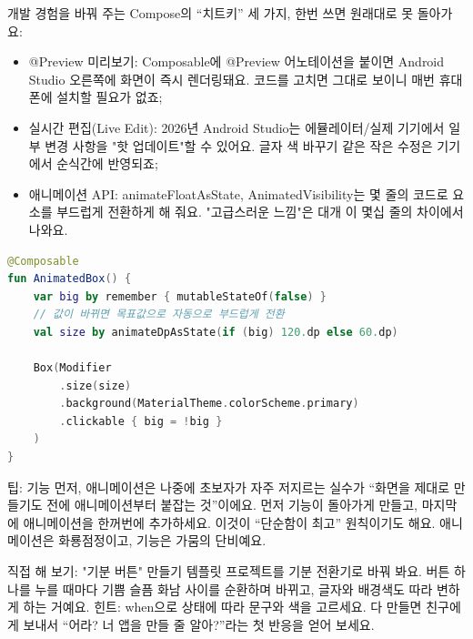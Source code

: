 
개발 경험을 바꿔 주는 Compose의 “치트키” 세 가지, 한번 쓰면 원래대로 못 돌아가요:

\begin{itemize}
  \item @Preview 미리보기: Composable에 @Preview 어노테이션을 붙이면 Android Studio 오른쪽에 화면이 즉시 렌더링돼요. 코드를 고치면 그대로 보이니 매번 휴대폰에 설치할 필요가 없죠;
  \item 실시간 편집(Live Edit): 2026년 Android Studio는 에뮬레이터/실제 기기에서 일부 변경 사항을 "핫 업데이트"할 수 있어요. 글자 색 바꾸기 같은 작은 수정은 기기에서 순식간에 반영되죠;
  \item 애니메이션 API: animateFloatAsState, AnimatedVisibility는 몇 줄의 코드로 요소를 부드럽게 전환하게 해 줘요. "고급스러운 느낌"은 대개 이 몇십 줄의 차이에서 나와요.
\end{itemize}

\begin{lstlisting}[language=Kotlin]
@Composable
fun AnimatedBox() {
    var big by remember { mutableStateOf(false) }
    // 값이 바뀌면 목표값으로 자동으로 부드럽게 전환
    val size by animateDpAsState(if (big) 120.dp else 60.dp)

    Box(Modifier
        .size(size)
        .background(MaterialTheme.colorScheme.primary)
        .clickable { big = !big }
    )
}
\end{lstlisting}

\begin{tcbinfo}{팁: 기능 먼저, 애니메이션은 나중에}
초보자가 자주 저지르는 실수가 “화면을 제대로 만들기도 전에 애니메이션부터 붙잡는 것”이에요. 먼저 기능이 돌아가게 만들고, 마지막에 애니메이션을 한꺼번에 추가하세요. 이것이 “단순함이 최고” 원칙이기도 해요. 애니메이션은 화룡점정이고, 기능은 가뭄의 단비예요.

\end{tcbinfo}

\begin{tcbpractice}{직접 해 보기: "기분 버튼" 만들기}
템플릿 프로젝트를 기분 전환기로 바꿔 봐요. 버튼 하나를 누를 때마다 기쁨 슬픔 화남 사이를 순환하며 바뀌고, 글자와 배경색도 따라 변하게 하는 거예요. 힌트: when으로 상태에 따라 문구와 색을 고르세요. 다 만들면 친구에게 보내서 “어라? 너 앱을 만들 줄 알아?”라는 첫 반응을 얻어 보세요.

\end{tcbpractice}

